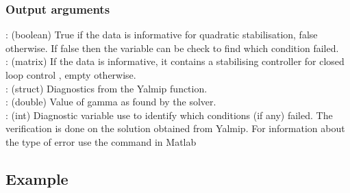 \subsubsection*{Output arguments}
\textbf{}: (boolean) True if the data is informative for quadratic stabilisation, false otherwise. If false then the  variable can be check to find which condition failed. \\
\textbf{}: (matrix) If the data is informative, it contains a stabilising controller  for closed loop control , empty otherwise.\\
\textbf{}: (struct) Diagnostics from the Yalmip  function. \\
\textbf{}: (double) Value of gamma as found by the solver. \\
\textbf{}: (int) Diagnostic variable use to identify which conditions (if any) failed. The verification is done on the solution obtained from Yalmip. For information about the type of error use the  command in Matlab


\subsection{Example}